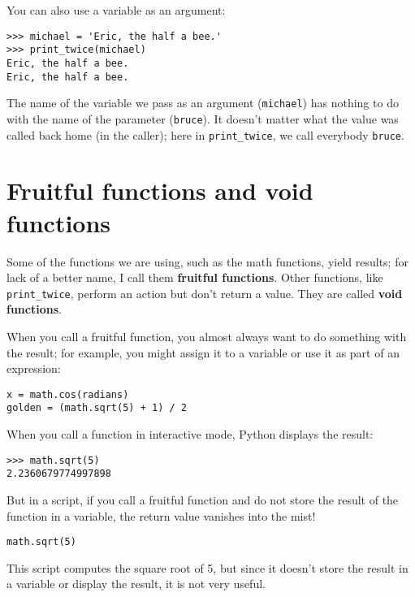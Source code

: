 You can also use a variable as an argument:

\beforeverb
\begin{verbatim}
>>> michael = 'Eric, the half a bee.'
>>> print_twice(michael)
Eric, the half a bee.
Eric, the half a bee.
\end{verbatim}
\afterverb
%
The name of the variable we pass as an argument ({\tt michael}) has
nothing to do with the name of the parameter ({\tt bruce}).  It
doesn't matter what the value was called back home (in the caller);
here in \verb"print_twice", we call everybody {\tt bruce}.

\section{Fruitful functions and void functions}


Some of the functions we are using, such as the math functions, yield
results; for lack of a better name, I call them {\bf fruitful
  functions}.  Other functions, like \verb"print_twice", perform an
action but don't return a value.  They are called {\bf void
  functions}.

When you call a fruitful function, you almost always
want to do something with the result; for example, you might
assign it to a variable or use it as part of an expression:

\beforeverb
\begin{verbatim}
x = math.cos(radians)
golden = (math.sqrt(5) + 1) / 2
\end{verbatim}
\afterverb
%
When you call a function in interactive mode, Python displays
the result:

\beforeverb
\begin{verbatim}
>>> math.sqrt(5)
2.2360679774997898
\end{verbatim}
\afterverb
%
But in a script, if you call a fruitful function and do 
not store the result of the function in a variable,
the return value vanishes into the mist!

\beforeverb
\begin{verbatim}
math.sqrt(5)
\end{verbatim}
\afterverb
%
This script computes the square root of 5, but since it doesn't store
the result in a variable or display the result, it is not very useful.


